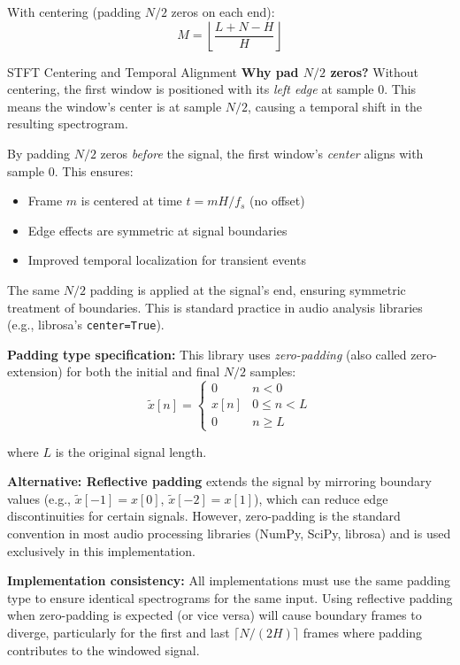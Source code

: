 With centering (padding $N/2$ zeros on each end):
\begin{equation}
  M = \left\lfloor\frac{L + N - H}{H}\right\rfloor
\end{equation}

\begin{concept}{STFT Centering and Temporal Alignment}
  \textbf{Why pad $N/2$ zeros?} Without centering, the first window
  is positioned with its \emph{left edge} at sample 0. This means the
  window's center is at sample $N/2$, causing a temporal shift in the
  resulting spectrogram.

  By padding $N/2$ zeros \emph{before} the signal, the first window's
  \emph{center} aligns with sample 0. This ensures:
  \begin{itemize}[itemsep=2pt]
    \item Frame $m$ is centered at time $t = mH/f_s$ (no offset)
    \item Edge effects are symmetric at signal boundaries
    \item Improved temporal localization for transient events
  \end{itemize}

  The same $N/2$ padding is applied at the signal's end, ensuring
  symmetric treatment of boundaries. This is standard practice in
  audio analysis libraries (e.g., librosa's \texttt{center=True}).

  \textbf{Padding type specification:} This library uses
  \emph{zero-padding} (also called zero-extension) for both the
  initial and final $N/2$ samples:
  \begin{equation}
    \tilde{x}[n] =
    \begin{cases}
      0 & n < 0 \\
      x[n] & 0 \leq n < L \\
      0 & n \geq L
    \end{cases}
  \end{equation}

  where $L$ is the original signal length.

  \textbf{Alternative: Reflective padding} extends the signal by
  mirroring boundary values (e.g., $\tilde{x}[-1] = x[0]$,
  $\tilde{x}[-2] = x[1]$), which can reduce edge discontinuities for
  certain signals. However, zero-padding is the standard convention
  in most audio processing libraries (NumPy, SciPy, librosa) and is
  used exclusively in this implementation.

  \textbf{Implementation consistency:} All implementations must use
  the same padding type to ensure identical spectrograms for the same
  input. Using reflective padding when zero-padding is expected (or
  vice versa) will cause boundary frames to diverge, particularly for
  the first and last $\lceil N/(2H) \rceil$ frames where padding
  contributes to the windowed signal.
\end{concept}

